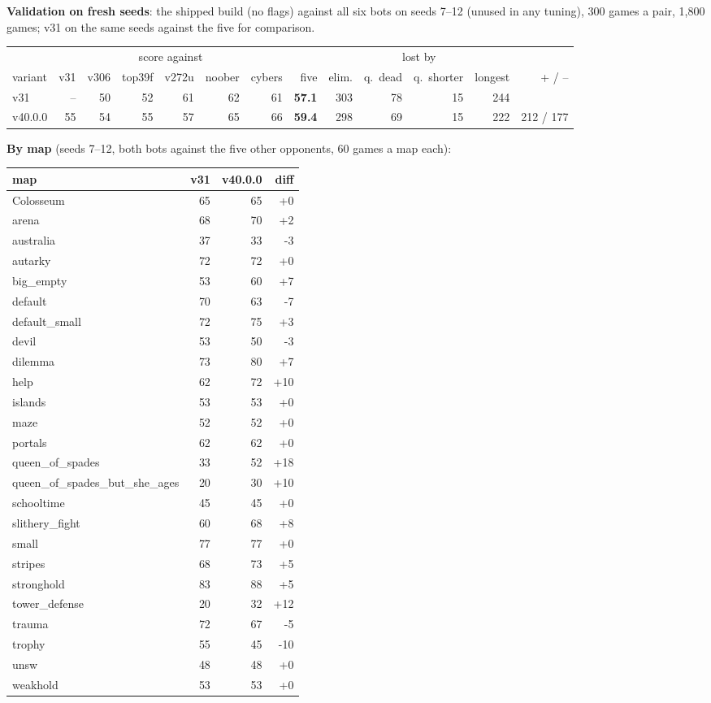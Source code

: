 \documentclass[11pt,a4paper]{article}
\begin{document}
\textbf{Validation on fresh seeds}: the shipped build (no flags) against all six bots on seeds 7--12 (unused in any
tuning), 300 games a pair, 1,800 games; v31 on the same seeds against the five for comparison.
\begin{center}
\small
\begin{tabular}{>{\raggedright\arraybackslash}p{4.6cm}rrrrrrrrrrrr}
  & \multicolumn{6}{c}{score against} & & \multicolumn{4}{c}{lost by} & \\
variant & v31 & v306 & top39f & v272u & noober & cybers & five & elim. & q.\ dead & q.\ shorter & longest & + / -- \\ \hline
  v31 & -- & 50 & 52 & 61 & 62 & 61 & \textbf{57.1} & 303 & 78 & 15 & 244 &  \\
  v40.0.0 & 55 & 54 & 55 & 57 & 65 & 66 & \textbf{59.4} & 298 & 69 & 15 & 222 & 212 / 177 \\
\end{tabular}
\normalsize
\end{center}


\textbf{By map} (seeds 7--12, both bots against the five other opponents, 60 games a map each):
\begin{center}
\small
\begin{tabular}{lrrr}
  map & v31 & v40.0.0 & diff \\ \hline
Colosseum & 65 & 65 & +0 \\
  arena & 68 & 70 & +2 \\
  australia & 37 & 33 & -3 \\
  autarky & 72 & 72 & +0 \\
  big\_empty & 53 & 60 & +7 \\
  default & 70 & 63 & -7 \\
  default\_small & 72 & 75 & +3 \\
  devil & 53 & 50 & -3 \\
  dilemma & 73 & 80 & +7 \\
  help & 62 & 72 & +10 \\
  islands & 53 & 53 & +0 \\
  maze & 52 & 52 & +0 \\
  portals & 62 & 62 & +0 \\
  queen\_of\_spades & 33 & 52 & +18 \\
  queen\_of\_spades\_but\_she\_ages & 20 & 30 & +10 \\
  schooltime & 45 & 45 & +0 \\
  slithery\_fight & 60 & 68 & +8 \\
  small & 77 & 77 & +0 \\
  stripes & 68 & 73 & +5 \\
  stronghold & 83 & 88 & +5 \\
  tower\_defense & 20 & 32 & +12 \\
  trauma & 72 & 67 & -5 \\
  trophy & 55 & 45 & -10 \\
  unsw & 48 & 48 & +0 \\
  weakhold & 53 & 53 & +0 \\
\end{tabular}
\normalsize
\end{center}
\end{document}
